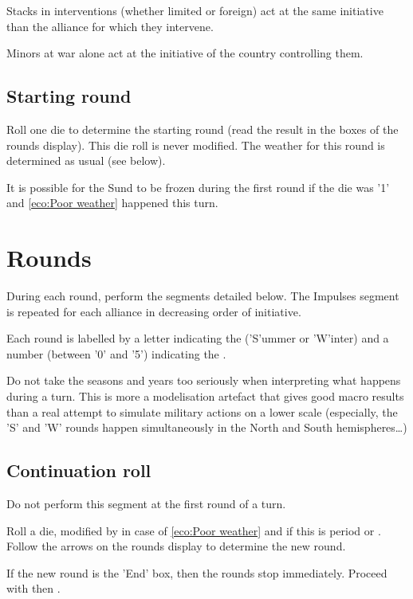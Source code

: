 Stacks in interventions (whether limited or foreign) act at the same
initiative than the alliance for which they intervene.

Minors at war alone act at the initiative of the country controlling them.

\subsection{Starting round}
Roll one die to determine the starting round (read the result in the boxes of
the rounds display). This die roll is never modified. The weather for this
round is determined as usual (see below).

It is possible for the Sund to be frozen during the first round if the die was
'1' and \ref{eco:Poor weather} happened this turn.

\section{Rounds}
\label{chMilitary:Rounds}
During each round, perform the segments detailed below. The Impulses segment
is repeated for each alliance in decreasing order of initiative.

Each round is labelled by a letter indicating the  ('S'ummer or
'W'inter) and a number (between '0' and '5') indicating the .

\begin{designnote}
  Do not take the seasons and years too seriously when interpreting what
  happens during a turn. This is more a modelisation artefact that gives good
  macro results than a real attempt to simulate military actions on a lower
  scale (especially, the 'S' and 'W' rounds happen simultaneously in the North
  and South hemispheres\ldots)
\end{designnote}

\subsection{Continuation roll}
\label{chMilitary:Rounds:Continuation roll}
Do not perform this segment at the first round of a turn.

Roll a die, modified by  in case of \ref{eco:Poor weather} and
 if this is period  or . Follow the arrows on
the rounds display to determine the new round.

If the new round is the 'End' box, then the rounds stop immediately. Proceed
with  then .

